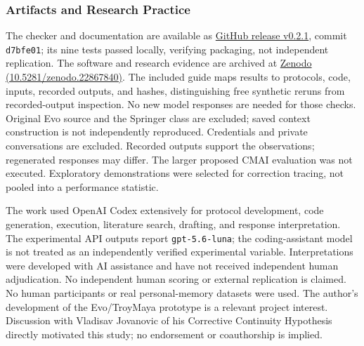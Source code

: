 \documentclass[runningheads]{llncs}
\begin{document}
\subsubsection{Artifacts and Research Practice}
The checker and documentation are available as \href{https://github.com/troyoch/correction-checker/releases/tag/v0.2.1}{GitHub release v0.2.1}, commit \texttt{d7bfe01}; its nine tests passed locally, verifying packaging, not independent replication. The software and research evidence are archived at \href{https://doi.org/10.5281/zenodo.22867840}{Zenodo (10.5281/zenodo.22867840)}. The included guide maps results to protocols, code, inputs, recorded outputs, and hashes, distinguishing free synthetic reruns from recorded-output inspection. No new model responses are needed for those checks. Original Evo source and the Springer class are excluded; saved context construction is not independently reproduced. Credentials and private conversations are excluded. Recorded outputs support the observations; regenerated responses may differ. The larger proposed CMAI evaluation was not executed. Exploratory demonstrations were selected for correction tracing, not pooled into a performance statistic.

The work used OpenAI Codex extensively for protocol development, code generation, execution, literature search, drafting, and response interpretation. The experimental API outputs report \texttt{gpt-5.6-luna}; the coding-assistant model is not treated as an independently verified experimental variable. Interpretations were developed with AI assistance and have not received independent human adjudication. No independent human scoring or external replication is claimed. No human participants or real personal-memory datasets were used. The author's development of the Evo/TroyMaya prototype is a relevant project interest. Discussion with Vladisav Jovanovic of his Corrective Continuity Hypothesis~\cite{jovanovic} directly motivated this study; no endorsement or coauthorship is implied.
\end{document}
